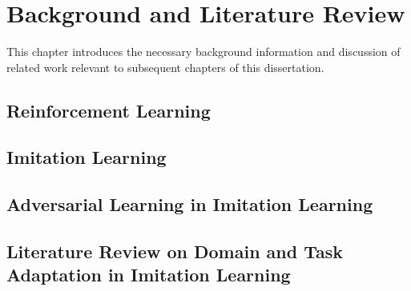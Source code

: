\chapter{Background and Literature Review\label{ch:Background}}


\renewcommand{\SectionsDir}{Chapter2/Sections}
\renewcommand{\SubsectionsDir}{Chapter2/Sections/Subsections}
\renewcommand{\FigsDir}{Chapter2/Figs}
\renewcommand{\TablesDir}{Chapter2/Tables}


This chapter introduces the necessary background information and discussion of related work relevant to subsequent chapters of this dissertation.


\section{Reinforcement Learning}


\section{Imitation Learning}


\section{Adversarial Learning in Imitation Learning}


\section{Literature Review on Domain and Task Adaptation in Imitation Learning}

